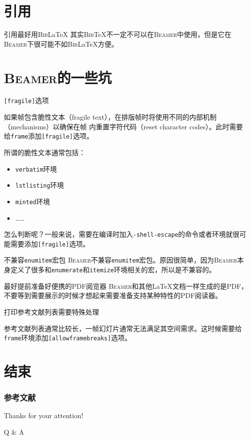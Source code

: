 \documentclass[aspectratio=169]{beamer}
\newcommand{\BibTeX}{\textsc{Bib}\TeX{}}
\newcommand{\BibLaTeX}{\textsc{Bib}\LaTeX{}}
\newcommand{\Beamer}{\textsc{Beamer}}
\newcommand{\enableindent}{\setlength{\parskip}{6pt}\setlength{\parindent}{2em}}
\begin{document}
\section{引用}

\begin{frame}{引用最好用\BibLaTeX{}}
	其实\BibTeX{}不一定不可以在\Beamer{}中使用，但是它在\Beamer{}下很可能不如\BibLaTeX{}方便。
\end{frame}

\section{\Beamer{}的一些坑}

\begin{frame}{\texttt{[fragile]}选项}
	\enableindent

	如果帧包含脆性文本（fragile text），在排版帧时将使用不同的内部机制（mechanisms）以确保在帧
	内重置字符代码（reset character codes）。此时需要给\texttt{frame}添加\texttt{[fragile]}选项。

	所谓的脆性文本通常包括：
	\begin{itemize}
		\item \texttt{verbatim}环境
		\item \texttt{lstlisting}环境
		\item \texttt{minted}环境
		\item ……
	\end{itemize}

	怎么判断呢？一般来说，需要在编译时加入\texttt{-shell-escape}的命令或者环境就很可能需要添加\texttt{[fragile]}选项。
\end{frame}

\begin{frame}{不兼容\texttt{enumitem}宏包}
	\enableindent
	\Beamer 不兼容\texttt{enumitem}宏包。原因很简单，因为\Beamer 本身定义了很多和\texttt{enumerate}和\texttt{itemize}环境相关的宏，所以是不兼容的。
\end{frame}

\begin{frame}{最好提前准备好便携的PDF阅览器}
	\enableindent
	\Beamer 和其他\LaTeX 文档一样生成的是PDF，不要等到需要展示的时候才想起来需要准备支持某种特性的PDF阅读器。
\end{frame}

\begin{frame}{打印参考文献列表需要特殊处理}

	参考文献列表通常比较长，一帧幻灯片通常无法满足其空间需求。这时候需要给\texttt{frame}环境添加\texttt{[allowframebreaks]}选项。
\end{frame}

\section{结束}
\begin{frame}[allowframebreaks]
	\frametitle{参考文献}
	{
		\tiny
		\nocite{*}
		\printbibliography[heading=none]
	}
\end{frame}

\begin{frame}
	\begin{center}
    {\Huge\calligra Thanks for your attention!}
    \vspace{1cm}

    {\Huge Q \& A}
  \end{center}
\end{frame}
\end{document}
